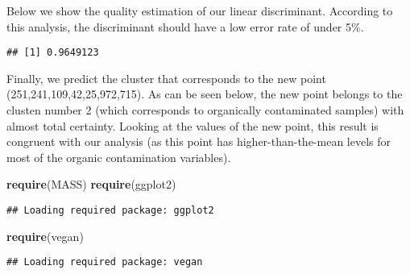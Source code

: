 \documentclass[]{article}
\newenvironment{Shaded}{\begin{snugshade}}{\end{snugshade}}
\newcommand{\KeywordTok}[1]{\textcolor[rgb]{0.13,0.29,0.53}{\textbf{#1}}}
\newcommand{\DataTypeTok}[1]{\textcolor[rgb]{0.13,0.29,0.53}{#1}}
\newcommand{\DecValTok}[1]{\textcolor[rgb]{0.00,0.00,0.81}{#1}}
\newcommand{\StringTok}[1]{\textcolor[rgb]{0.31,0.60,0.02}{#1}}
\newcommand{\CommentTok}[1]{\textcolor[rgb]{0.56,0.35,0.01}{\textit{#1}}}
\newcommand{\OperatorTok}[1]{\textcolor[rgb]{0.81,0.36,0.00}{\textbf{#1}}}
\newcommand{\NormalTok}[1]{#1}
\begin{document}
Below we show the quality estimation of our linear discriminant.
According to this analysis, the discriminant should have a low error
rate of under 5\%.

\begin{Shaded}
\end{Shaded}

\begin{verbatim}
## [1] 0.9649123
\end{verbatim}

Finally, we predict the cluster that corresponds to the new point
(251,241,109,42,25,972,715). As can be seen below, the new point belongs
to the clusten number 2 (which corresponds to organically contaminated
samples) with almost total certainty. Looking at the values of the new
point, this result is congruent with our analysis (as this point has
higher-than-the-mean levels for most of the organic contamination
variables).

\begin{Shaded}
\begin{Highlighting}[]
\KeywordTok{require}\NormalTok{(MASS)}
\KeywordTok{require}\NormalTok{(ggplot2)}
\end{Highlighting}
\end{Shaded}

\begin{verbatim}
## Loading required package: ggplot2
\end{verbatim}

\begin{Shaded}
\begin{Highlighting}[]
\KeywordTok{require}\NormalTok{(vegan)}
\end{Highlighting}
\end{Shaded}

\begin{verbatim}
## Loading required package: vegan
\end{verbatim}
\end{document}
